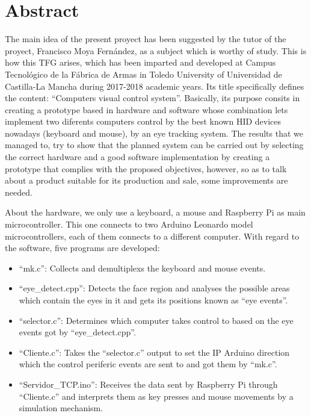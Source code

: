 \newpage
\chapter*{Abstract} \label{abstract}
\pagestyle{empty}
\thispagestyle{empty} 

The main idea of the present proyect has been suggested by the tutor of the proyect, Francisco Moya Fernández, as a subject which is worthy of study. This is how this TFG arises, which has been imparted and developed at Campus Tecnológico de la Fábrica de Armas in Toledo University of Universidad de Castilla-La Mancha during 2017-2018 academic years. Its title specifically defines the content: ``Computers visual control system''. Basically, its purpose consits in creating a prototype based in hardware and software whose combination lets implement two diferents computers control by the best known HID devices nowadays (keyboard and mouse), by an eye tracking system. The results that we managed to, try to show that the planned system can be carried out by selecting the correct hardware and a good software implementation by creating a prototype that complies with the proposed objectives, however, so as to talk about a product suitable for its production and sale, some improvements are needed.

About the hardware, we only use a keyboard, a mouse and Raspberry Pi as main microcontroller. This one connects to two Arduino Leonardo model microcontrollers, each of them connects to a different computer. With regard to the software, five programs are developed:

\begin{itemize}
    \item ``mk.c'': Collects and demultiplexs the keyboard and mouse events.
    \item ``eye\_detect.cpp'': Detects the face region and analyses the possible areas which contain the eyes in it and gets its positions known as ``eye events''.
    \item ``selector.c'': Determines which computer takes control to based on the eye events got by ``eye\_detect.cpp''.
    \item ``Cliente.c'': Takes the ``selector.c'' output to set the IP Arduino direction which the control periferic events are sent to and got them by ``mk.c''.
    \item ``Servidor\_TCP.ino'': Receives the data sent by Raspberry Pi through ``Cliente.c'' and interprets them as key presses and mouse movements by a simulation mechanism.
\end{itemize}